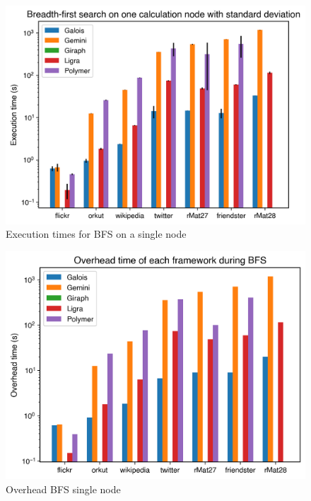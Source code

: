 \begin{figure}
	\includegraphics[width=\columnwidth]{../../plots/singleNodeBFS_execTime.png}
	\caption{Execution times for BFS on a single node}
	\label{fig:singleNodeBFS_exec}
\end{figure}

\begin{figure}
	\includegraphics[width=\columnwidth]{../../plots/singleNodeBFS_overheadTime.png}
	\caption{Overhead BFS single node}
	\label{fig:singleNodeBFS_overhead}
\end{figure}

